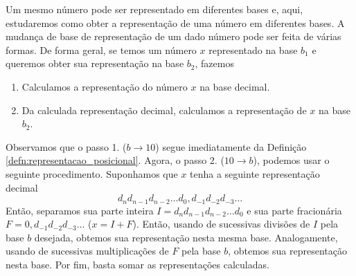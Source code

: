 Um mesmo número pode ser representado em diferentes bases e, aqui, estudaremos como obter a representação de uma número em diferentes bases. A mudança de base de representação de um dado número pode ser feita de várias formas. De forma geral, se temos um número $x$ representado na base $b_1$ e queremos obter sua representação na base $b_2$, fazemos
\begin{enumerate}[1.]
\item Calculamos a representação do número $x$ na base decimal.
\item Da calculada representação decimal, calculamos a representação de $x$ na base $b_2$.
\end{enumerate}
Observamos que o passo 1. ($b \to 10$) segue imediatamente da Definição \ref{defn:representacao_posicional}. Agora, o passo 2. ($10\to b$), podemos usar o seguinte procedimento. Suponhamos que $x$ tenha a seguinte representação decimal
\begin{equation}
  d_nd_{n-1}d_{n-2}\ldots d_0,d_{-1}d_{-2}d_{-3}\ldots
\end{equation}
Então, separamos sua parte inteira $I = d_nd_{n-1}d_{n-2}\ldots d_0$ e sua parte fracionária $F = 0,d_{-1}d_{-2}d_{-3}\ldots$ ($x = I + F$). Então, usando de sucessivas divisões de $I$ pela base $b$ desejada, obtemos sua representação nesta mesma base. Analogamente, usando de sucessivas multiplicações de $F$ pela base $b$, obtemos sua representação nesta base. Por fim, basta somar as representações calculadas.

